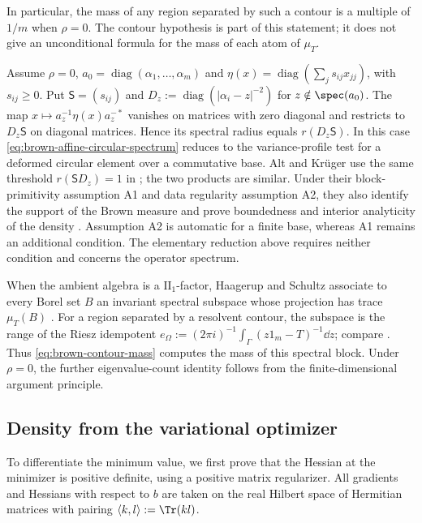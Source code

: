 In particular, the mass of any region separated by such a contour is a multiple of $1/m$ when $\rho=0$.
The contour hypothesis is part of this statement; it does not give an unconditional formula for the mass of each atom of $\mu_T$.

\begin{remark}
\label{rem:brown-variance-profile}
Assume $\rho=0$, $a_0=\operatorname{diag}(\alpha_1,\ldots,\alpha_m)$ and $\eta(x)=\operatorname{diag}(\sum_j s_{ij}x_{jj})$, with $s_{ij}\ge0$.
Put $\mathsf S=(s_{ij})$ and $D_z:=\operatorname{diag}(|\alpha_i-z|^{-2})$ for $z\notin\spec(a_0)$.
The map $x\mapsto a_z^{-1}\eta(x)a_z^{-*}$ vanishes on matrices with zero diagonal and restricts to $D_z\mathsf S$ on diagonal matrices.
Hence its spectral radius equals $r(D_z\mathsf S)$.
In this case \eqref{eq:brown-affine-circular-spectrum} reduces to the variance-profile test for a deformed circular element over a commutative base.
Alt and Kr\"uger use the same threshold $r(\mathsf S D_z)=1$ in \cite[arXiv version, Proposition~5.16]{AK26}; the two products are similar.
Under their block-primitivity assumption A1 and data regularity assumption A2, they also identify the support of the Brown measure and prove boundedness and interior analyticity of the density \cite[arXiv version, Theorem~2.2]{AK26}.
Assumption A2 is automatic for a finite base, whereas A1 remains an additional condition.
The elementary reduction above requires neither condition and concerns the operator spectrum.
\end{remark}

\begin{remark}
\label{rem:brown-spectral-subspaces}
When the ambient algebra is a $\mathrm{II}_1$-factor, Haagerup and Schultz associate to every Borel set $B$ an invariant spectral subspace whose projection has trace $\mu_T(B)$ \cite[Theorem~1.1]{HS09}.
For a region separated by a resolvent contour, the subspace is the range of the Riesz idempotent $e_\Omega:=(2\pi i)^{-1}\int_\Gamma(z1_m-T)^{-1}\dd z$; compare \cite[Introduction, (1.3)]{HS09}.
Thus \eqref{eq:brown-contour-mass} computes the mass of this spectral block.
Under $\rho=0$, the further eigenvalue-count identity follows from the finite-dimensional argument principle.
\end{remark}

\subsection{Density from the variational optimizer}
\label{subsec:brown-density}
To differentiate the minimum value, we first prove that the Hessian at the minimizer is positive definite, using a positive matrix regularizer.
All gradients and Hessians with respect to $b$ are taken on the real Hilbert space of Hermitian matrices with pairing $\langle k,l\rangle:=\Tr(kl)$.

